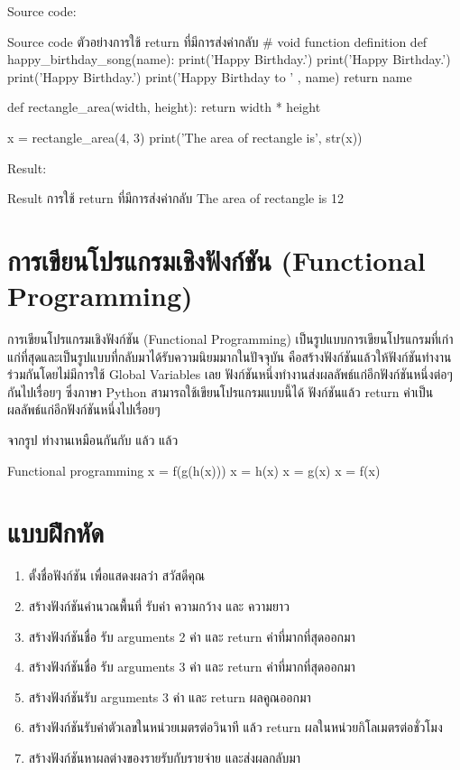 Source code:
\begin{codelist}{Source code ตัวอย่างการใช้ return ที่มีการส่งค่ากลับ}{}
# void function definition
def happy_birthday_song(name):
    print('Happy Birthday.')
    print('Happy Birthday.')
    print('Happy Birthday.')
    print('Happy Birthday to ' , name)
    return name

def rectangle_area(width, height):
    return width * height
    
x = rectangle_area(4, 3)
print('The area of rectangle is', str(x))
\end{codelist}

Result:
\begin{codelist}{Result การใช้ return ที่มีการส่งค่ากลับ}{}
The area of rectangle is 12
\end{codelist}


\section{การเขียนโปรแกรมเชิงฟังก์ชัน (Functional Programming)}


การเขียนโปรแกรมเชิงฟังก์ชัน (Functional Programming) เป็นรูปแบบการเขียนโปรแกรมที่เก่าแก่ที่สุดและเป็นรูปแบบที่กลับมาได้รับความนิยมมากในปัจจุบัน คือสร้างฟังก์ชันแล้วให้ฟังก์ชันทำงานร่วมกันโดยไม่มีการใช้ Global Variables เลย ฟังก์ชันหนึ่งทำงานส่งผลลัพธ์แก่อีกฟังก์ชันหนึ่งต่อๆ กันไปเรื่อยๆ ซึ่งภาษา Python สามารถใช้เขียนโปรแกรมแบบนี้ได้ ฟังก์ชันแล้ว return ค่าเป็นผลลัพธ์แก่อีกฟังก์ชันหนึ่งไปเรื่อยๆ  

จากรูป   ทำงานเหมือนกันกับ  แล้ว   แล้ว  

\begin{codelist}{Functional programming}{}
x = f(g(h(x)))
x = h(x)
x = g(x)
x = f(x)
\end{codelist}


\section{แบบฝึกหัด}

\begin{enumerate} 

\item ตั้งชื่อฟังก์ชัน  เพื่อแสดงผลว่า สวัสดีคุณ
\item สร้างฟังก์ชันคำนวณพื้นที่ รับค่า ความกว้าง และ ความยาว
\item สร้างฟังก์ชันชื่อ   รับ arguments 2 ค่า และ return ค่าที่มากที่สุดออกมา
\item สร้างฟังก์ชันชื่อ   รับ arguments 3 ค่า และ return ค่าที่มากที่สุดออกมา
\item สร้างฟังก์ชันรับ arguments 3 ค่า และ return ผลคูณออกมา
\item สร้างฟังก์ชันรับค่าตัวเลขในหน่วยเมตรต่อวินาที แล้ว return ผลในหน่วยกิโลเมตรต่อชั่วโมง
\item สร้างฟังก์ชันหาผลต่างของรายรับกับรายจ่าย และส่งผลกลับมา

\end{enumerate}


